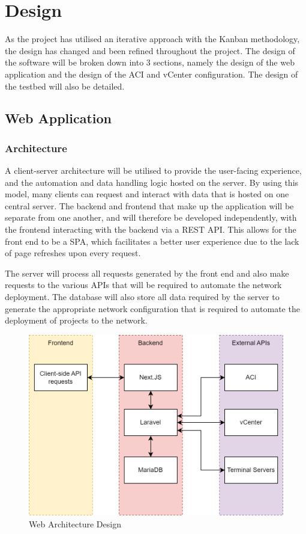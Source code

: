 \chapter{Design}
\label{chap:design}
As the project has utilised an iterative
approach with the Kanban methodology, the design has changed and been refined
throughout the project. The design of the software will be broken down into 3
sections, namely the design of the web application and the design of the ACI
and vCenter configuration.
The design of the testbed will also be detailed.

\section{Web Application}
\label{design:web-application}
\subsection{Architecture}
\label{design:web-application:architecture}

A
client-server architecture will be utilised to provide the user-facing
experience, and the automation and data handling logic hosted on the server. By
using this model, many clients can request and interact with data that is
hosted on one central server. The backend and frontend that make up the
application will be separate from one another, and will therefore be developed
independently, with the frontend interacting with the backend via a REST API.
This allows for the front end to be a SPA, which facilitates a better user
experience due to the lack of page refreshes upon every request.

The server
will process all requests generated by the front end and also make requests to
the various APIs that will be required to automate the network deployment. The
database will also store all data required by the server to generate the
appropriate network configuration that is required to automate the deployment
of projects to the network.

\begin{figure}[H]
    \centering

    \includegraphics[scale=0.3]{images/web-architecture.png}
    \caption{Web
        Architecture Design}
    \label{fig:web-architecture}
\end{figure}

